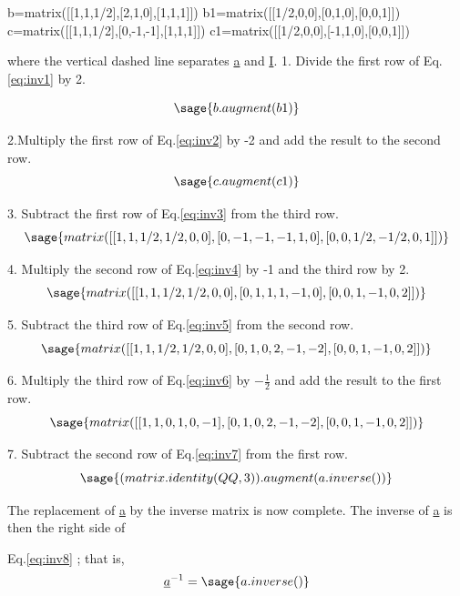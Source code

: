 \documentclass[12pt]{report}
\newcommand{\lab}[1]{
	Eq.\ref{#1}
}
\begin{document}
\begin{sagesilent}
	b=matrix([[1,1,1/2],[2,1,0],[1,1,1]])
	b1=matrix([[1/2,0,0],[0,1,0],[0,0,1]])
	c=matrix([[1,1,1/2],[0,-1,-1],[1,1,1]])
	c1=matrix([[1/2,0,0],[-1,1,0],[0,0,1]])
\end{sagesilent}

where the vertical dashed line separates \underline{a} and \underline{I}.
1. Divide the first row of \lab{eq:inv1} by 2.

\begin{equation}
	\sage{b.augment(b1)}
	\label{eq:inv2}
\end{equation}

2.Multiply the first row of \lab{eq:inv2} by -2 and add the result to
the second row.
\begin{equation}
	\sage{c.augment(c1)}
	\label{eq:inv3}
\end{equation}

3. Subtract the first row of \lab{eq:inv3} from the third row.
\begin{equation}
	\sage{matrix([[1,1,1/2,1/2,0,0],[0,-1,-1,-1,1,0],[0,0,1/2,-1/2,0,1]])}
	\label{eq:inv4}
\end{equation}

4. Multiply the second row of \lab{eq:inv4} by -1 and the third row by 2.
\begin{equation}
	\sage{matrix([[1,1,1/2,1/2,0,0],[0,1,1,1,-1,0],[0,0,1,-1,0,2]])}
	\label{eq:inv5}
\end{equation}

5. Subtract the third row of \lab{eq:inv5} from the second row.
\begin{equation}
	\sage{matrix([[1,1,1/2,1/2,0,0],[0,1,0,2,-1,-2],[0,0,1,-1,0,2]])}
	\label{eq:inv6}
\end{equation}

6. Multiply the third row of \lab{eq:inv6} by $-\frac{1}{2}$ and add the
result to the first row.
\begin{equation}
	\sage{matrix([[1,1,0,1,0,-1],[0,1,0,2,-1,-2],[0,0,1,-1,0,2]])}
	\label{eq:inv7}
\end{equation}

7. Subtract the second row of \lab{eq:inv7} from the first row.
\begin{equation} 
	\sage{(matrix.identity(QQ,3)).augment(a.inverse())}
	\label{eq:inv8}
\end{equation}

The replacement of \underline{a} by the inverse matrix is now
complete. The inverse of \underline{a} is then the right side of
\lab{eq:inv8}; that is,
\begin{equation}
	\underline{a}^{-1} = \sage{a.inverse()}
\end{equation}
\end{document}
